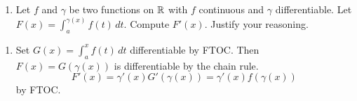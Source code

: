 \documentclass[10pt, a4paper]{article}
\begin{document}
\begin{problem}
    \begin{enumerate}[label = (\roman*)]
        \item Let $f$ and $\gamma$ be two functions on $\mathbb{R}$ with $f$ continuous and $\gamma$ differentiable.
        Let $F(x) = \int_{a}^{\gamma(x)}f(t)\,dt$.
        Compute $F'(x)$.
        Justify your reasoning.
    \end{enumerate}

    \begin{solution}
        \begin{enumerate}[label = (\roman*)]
            \item
            Set $G(x) = \int_{a}^{x}f(t)\,dt$ differentiable by FTOC.
            Then $F(x) = G(\gamma(x))$ is differentiable by the chain rule.
            \[
            F'(x) = \gamma'(x)G'(\gamma(x)) = \gamma'(x)f(\gamma(x))
            \]
            by FTOC.
        \end{enumerate}
    \end{solution}
\end{problem}
\end{document}
